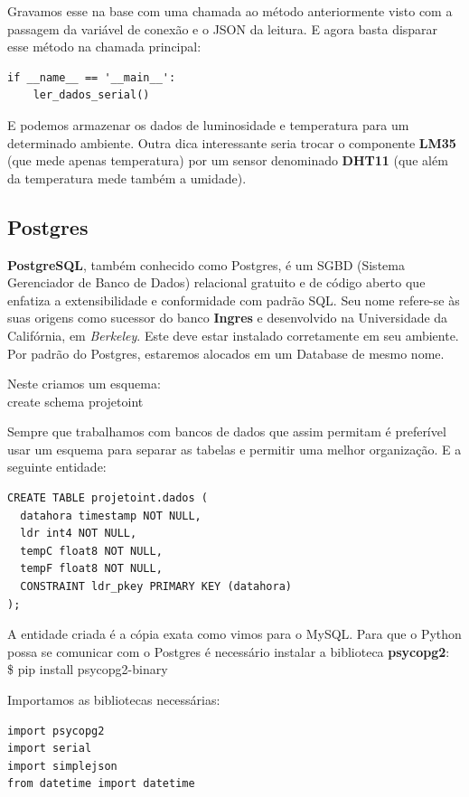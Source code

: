 \documentclass[a4paper,11pt]{article}
\begin{document}
Gravamos esse na base com uma chamada ao método anteriormente visto com a passagem da variável de conexão e o JSON da leitura. E agora basta disparar esse método na chamada principal:
\begin{lstlisting}[]
  if __name__ == '__main__':
    ler_dados_serial()
\end{lstlisting}

E podemos armazenar os dados de luminosidade e temperatura para um determinado ambiente. Outra dica interessante seria trocar o componente \textbf{LM35} (que mede apenas temperatura) por um sensor denominado \textbf{DHT11} (que além da temperatura mede também a umidade).

\subsection*{Postgres}
\textbf{PostgreSQL}, também conhecido como Postgres, é um SGBD (Sistema Gerenciador de Banco de Dados) relacional gratuito e de código aberto que enfatiza a extensibilidade e conformidade com padrão SQL. Seu nome refere-se às suas origens como sucessor do banco \textbf{Ingres} e desenvolvido na Universidade da Califórnia, em \textit{Berkeley}. Este deve estar instalado corretamente em seu ambiente. Por padrão do Postgres, estaremos alocados em um Database de mesmo nome.

Neste criamos um esquema: \\
{\ttfamily create schema projetoint}

Sempre que trabalhamos com bancos de dados que assim permitam é preferível usar um esquema para separar as tabelas e permitir uma melhor organização. E a seguinte entidade:
\begin{lstlisting}[]
CREATE TABLE projetoint.dados (
  datahora timestamp NOT NULL,
  ldr int4 NOT NULL,
  tempC float8 NOT NULL,
  tempF float8 NOT NULL,
  CONSTRAINT ldr_pkey PRIMARY KEY (datahora)
);
\end{lstlisting}

A entidade criada é a cópia exata como vimos para o MySQL. Para que o Python possa se comunicar com o Postgres é necessário instalar a biblioteca \textbf{psycopg2}: \\
{\ttfamily\$ pip install psycopg2-binary}

Importamos as bibliotecas necessárias:
\begin{lstlisting}[]
import psycopg2
import serial
import simplejson
from datetime import datetime
\end{lstlisting}
\end{document}

